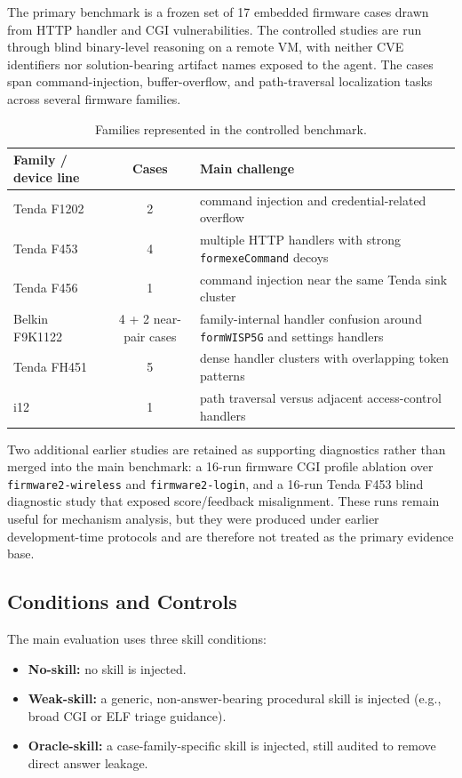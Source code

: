 ﻿\documentclass[preprint,12pt]{elsarticle}
\begin{document}
The primary benchmark is a frozen set of 17 embedded firmware cases drawn
from HTTP handler and CGI vulnerabilities.  The controlled studies are run
through blind binary-level reasoning on a remote VM, with neither CVE
identifiers nor solution-bearing artifact names exposed to the agent.  The
cases span command-injection, buffer-overflow, and path-traversal
localization tasks across several firmware families.

\begin{table}[t]
\centering
\caption{Families represented in the controlled benchmark.}
\label{tab:cases}
\footnotesize
\begin{tabular}{l c l}
\toprule
Family / device line & Cases & Main challenge \\
\midrule
Tenda F1202 & 2 & command injection and credential-related overflow \\
Tenda F453 & 4 & multiple HTTP handlers with strong \texttt{formexeCommand} decoys \\
Tenda F456 & 1 & command injection near the same Tenda sink cluster \\
Belkin F9K1122 & 4 + 2 near-pair cases & family-internal handler confusion around \texttt{formWISP5G} and settings handlers \\
Tenda FH451 & 5 & dense handler clusters with overlapping token patterns \\
i12 & 1 & path traversal versus adjacent access-control handlers \\
\bottomrule
\end{tabular}
\end{table}

Two additional earlier studies are retained as supporting diagnostics rather
than merged into the main benchmark: a 16-run firmware CGI profile ablation
over \texttt{firmware2-wireless} and \texttt{firmware2-login}, and a
16-run Tenda F453 blind diagnostic study that exposed score/feedback
misalignment.  These runs remain useful for mechanism analysis, but they
were produced under earlier development-time protocols and are therefore
not treated as the primary evidence base.

\subsection{Conditions and Controls}

The main evaluation uses three skill conditions:
\begin{itemize}[leftmargin=*]
    \item \textbf{No-skill:} no skill is injected.
    \item \textbf{Weak-skill:} a generic, non-answer-bearing procedural
    skill is injected (e.g., broad CGI or ELF triage guidance).
    \item \textbf{Oracle-skill:} a case-family-specific skill is injected,
    still audited to remove direct answer leakage.
\end{itemize}
\end{document}

